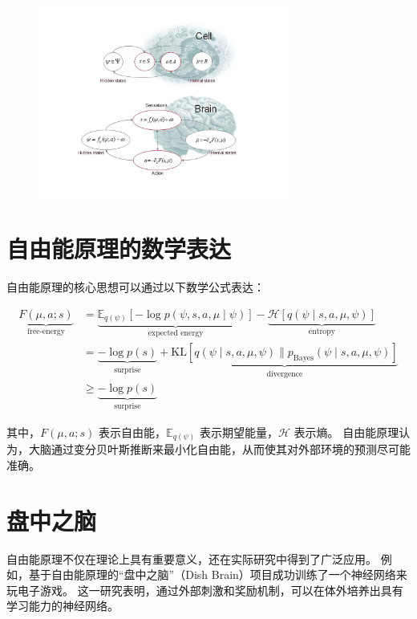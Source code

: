 \begin{figure}[!htbp]
    \centering
    \includegraphics[width=0.75\textwidth]{Img/fep-marokov-blanket.jpg}
    \label{fig:fep-marokov-blanket}
\end{figure}

\section{自由能原理的数学表达}\label{sec:free-energy-math}
自由能原理的核心思想可以通过以下数学公式表达：

\[
    \begin{aligned}
        \underbrace{F(\mu, a; s)}_{\text{free-energy}} & = \underbrace{\mathbb{E}_{q(\psi)} \left[ -\log p(\psi, s, a, \mu \mid \psi) \right]}_{\text{expected energy}} - \underbrace{\mathcal{H}[q(\psi \mid s, a, \mu, \psi)]}_{\text{entropy}} \\
                                                       & = \underbrace{-\log p(s)}_{\text{surprise}} + \underbrace{\text{KL}[q(\psi \mid s, a, \mu, \psi) \parallel p_{\text{Bayes}}(\psi \mid s, a, \mu, \psi)]}_{\text{divergence}}             \\
                                                       & \geq \underbrace{-\log p(s)}_{\text{surprise}}
    \end{aligned}
\]

其中，$F(\mu, a; s)$ 表示自由能，$\mathbb{E}_{q(\psi)}$ 表示期望能量，$\mathcal{H}$ 表示熵。
自由能原理认为，大脑通过变分贝叶斯推断来最小化自由能，从而使其对外部环境的预测尽可能准确。


\section{盘中之脑}\label{sec:dish-brain}
自由能原理不仅在理论上具有重要意义，还在实际研究中得到了广泛应用。
例如，基于自由能原理的“盘中之脑”（Dish Brain）项目成功训练了一个神经网络来玩电子游戏\cite{Kagan2022}。
这一研究表明，通过外部刺激和奖励机制，可以在体外培养出具有学习能力的神经网络。

